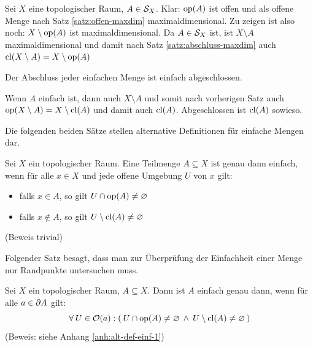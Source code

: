     \begin{bew}
        Sei $X$ eine topologischer Raum, $A \in \mathcal{S}_X$. 
        Klar: $\text{op}(A)$ ist offen und als offene Menge nach Satz \ref{satz:offen-maxdim} maximaldimensional.
        Zu zeigen ist also noch: $X \setminus \text{op}(A)$ ist maximaldimensional.
        Da $A \in \mathcal{S}_X$ ist, ist $X \setminus A$ maximaldimensional und damit nach Satz \ref{satz:abschluss-maxdim} auch $\text{cl}(X \setminus A) = X \setminus \text{op}(A)$
    \end{bew}
    
    
    \begin{kor}
        Der Abschluss jeder einfachen Menge ist einfach abgeschlossen.
    \end{kor}
    
    \begin{bew}
        Wenn $A$ einfach ist, dann auch $X \setminus A$ und somit nach vorherigen Satz auch $\text{op}(X \setminus A) = X \setminus \text{cl}(A)$ und damit auch $\text{cl}(A)$. 
        Abgeschlossen ist $\text{cl}(A)$ sowieso.
    \end{bew}


    Die folgenden beiden Sätze stellen alternative Definitionen für einfache Mengen dar.
    \begin{satz}
        Sei $X$ ein topologischer Raum. Eine Teilmenge $A \subseteq X$ ist genau dann einfach, wenn für alle $x \in X$ und jede offene Umgebung $U$ von $x$ gilt:
        \begin{itemize}
            \item falls $x \in A$, so gilt $U \cap \text{op}(A) \neq \varnothing$
            \item falls $x \notin A$, so gilt $U \setminus \text{cl}(A) \neq \varnothing$
        \end{itemize}
        (Beweis trivial)
    \end{satz}


    Folgender Satz besagt, dass man zur Überprüfung der Einfachheit einer Menge nur Randpunkte untersuchen muss. 
    \begin{satz}\label{satz:alt-def-einf-1}
        Sei $X$ ein topologischer Raum, $A \subseteq X$. Dann ist $A$ einfach genau dann, wenn für alle $a \in \partial A$ gilt:
        $$\forall\: U \in \mathcal{O}(a): (\: U \cap \text{op}(A) \neq \varnothing \:\land\: U \setminus \text{cl}(A) \neq \varnothing \:) $$
        (Beweis: siehe Anhang \ref{anh:alt-def-einf-1})
    \end{satz}
   
